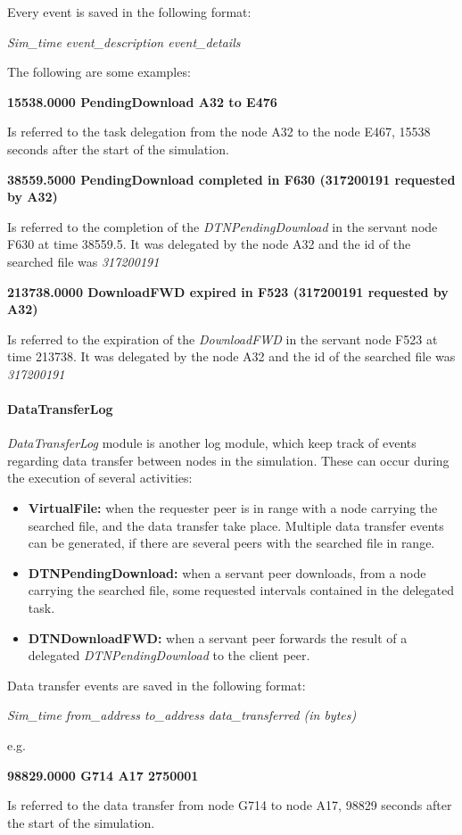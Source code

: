 Every event is saved in the following format:
\begin{center}
\textit{Sim\_time	event\_description	event\_details}
\end{center}
The following are some examples:

\begin{center}
\textbf{15538.0000	PendingDownload	A32 to E476}
\end{center}
Is referred to the task delegation from the node A32 to the node E467, 15538 seconds after the start of the simulation.
\\

\begin{center}
\textbf{38559.5000 PendingDownload completed in F630 (317200191 requested by A32)}
\end{center}
Is referred to the completion of the \textit{DTNPendingDownload} in the servant node F630 at time 38559.5. It was delegated by the node A32 and the id of the searched file was \textit{317200191}
\\

\begin{center}
\textbf{213738.0000	DownloadFWD expired in F523 (317200191 requested by A32)}
\end{center}
Is referred to the expiration of the \textit{DownloadFWD} in the servant node F523 at time 213738. It was delegated by the node A32 and the id of the searched file was \textit{317200191}
\\

\paragraph{DataTransferLog}
\textit{DataTransferLog} module is another log module, which keep track of events regarding data transfer between nodes in the simulation. These can occur during the execution of several activities:
\begin{itemize}
\item \textbf{VirtualFile:} when the requester peer is in range with a node carrying the searched file, and the data transfer take place. Multiple data transfer events can be generated, if there are several peers with the searched file in range.
\item \textbf{DTNPendingDownload:} when a servant peer downloads, from a node carrying the searched file, some requested intervals contained in the delegated task.
\item \textbf{DTNDownloadFWD:} when a servant peer forwards the result of a delegated \textit{DTNPendingDownload} to the client peer.
\end{itemize}
Data transfer events are saved in the following format:
\begin{center}
\textit{Sim\_time	from\_address	to\_address	data\_transferred (in bytes)}
\end{center}
e.g.
\begin{center}
\textbf{98829.0000	G714	A17	2750001}
\end{center}
Is referred to the data transfer from node G714 to node A17, 98829 seconds after the start of the simulation.
\\

